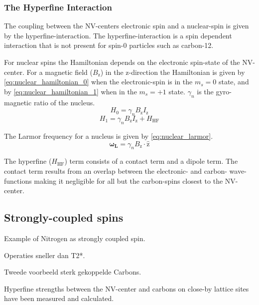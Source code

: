 \begin{figure}[htbp]
\end{figure}




\subsubsection{The Hyperfine Interaction}
The coupling between the NV-centers electronic spin and a nuclear-spin is given by the hyperfine-interaction. The hyperfine-interaction is a spin dependent interaction that is not present for spin-0 particles such as carbon-12.

For nuclear spins the Hamiltonian depends on the electronic spin-state of the NV-center.
For a magnetic field ($B_\mathrm{z}$) in the z-direction the Hamiltonian is given by \cref{eq:nuclear_hamiltonian_0} when the electronic-spin is in the $m_s = 0$ state, and by \cref{eq:nuclear_hamiltonian_1} when in the $m_s = +1$ state\citep{Taminiau2014Universal}. $\gamma_n$ is the gyro-magnetic ratio of the nucleus.
 \begin{equation}
 \label{eq:nuclear_hamiltonian_0}
H_0= \gamma_{n} B_\mathrm{z} I_\mathrm{z}
\end{equation}
\begin{equation}
 \label{eq:nuclear_hamiltonian_1}
    H_1 = \gamma_{n} B_\mathrm{z} I_\mathrm{z} +H_{\mathrm{HF}}
\end{equation}

The Larmor frequency for a nucleus is given by  \cref{eq:nuclear_larmor}.
\begin{equation}
\label{eq:nuclear_larmor}
\bm{\omega_L} = \gamma_{n}B_\mathrm{z} \cdot\bm{\hat{\mathrm{z}}}
\end{equation}

The hyperfine ($H_{\mathrm{HF}}$) term consists of a contact term and a dipole term.
The contact term results from an overlap between the electronic- and carbon- wave-functions making it negligible for all but the carbon-spins closest to the NV-center.


\subsection{Strongly-coupled spins}
Example of Nitrogen as strongly coupled spin.

Operaties sneller dan T2*.

Tweede voorbeeld sterk gekoppelde Carbons.

Hyperfine strengths between the NV-center and carbons on close-by lattice sites have been measured\citep{Smeltzer201113} and calculated\citep{Gali2008Ab,Gali2009Identification}.


